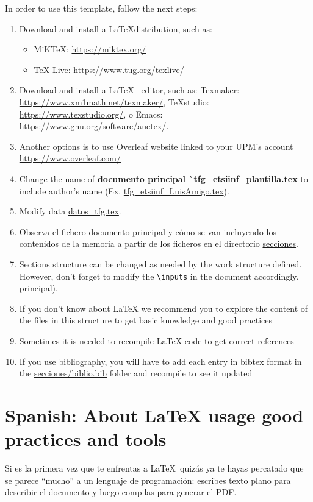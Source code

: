 \medskip

In order to use this template, follow the next steps:
\begin{enumerate}
\item Download and install a \LaTeX distribution, such as:
  \begin{itemize}
  \item MiKTeX:  \url{https://miktex.org/}
  \item TeX Live: \url{https://www.tug.org/texlive/}
  \end{itemize}
\item Download and install a \LaTeX~ editor, such as:
  Texmaker: \url{https://www.xm1math.net/texmaker/}, TeXstudio:
  \url{https://www.texstudio.org/}, o Emacs:
  \url{https://www.gnu.org/software/auctex/}.
\item Another options is to use Overleaf website linked to your UPM's account \url{https://www.overleaf.com/}
\item Change the name of \textbf{documento principal
    \url{`tfg_etsiinf_plantilla.tex}} to include author's name (Ex. \url{tfg_etsiinf_LuisAmigo.tex}).
\item Modify data \url{datos_tfg.tex}.
\item Observa el fichero documento principal y cómo se van incluyendo
  los contenidos de la memoria a partir de los ficheros en el
  directorio \url{secciones}.
\item Sections structure can be changed as needed by the work structure defined. However, don't forget to modify the \verb|\inputs| in the document accordingly.
  principal).
\item If you don't know about LaTeX we recommend you to explore the content of the files in this structure to get basic knowledge and good practices
\item Sometimes it is needed to recompile LaTeX code to get correct references
\item If you use bibliography, you will have to add each entry in \url{bibtex} format in the \url{secciones/biblio.bib} folder and recompile to see it updated
\end{enumerate}

\section{Spanish: About LaTeX usage good practices and tools}
\label{sec:latex}

Si es la primera vez que te enfrentas a \LaTeX\ quizás ya te hayas
percatado que se parece ``mucho'' a un lenguaje de programación:
escribes texto plano para describir el documento y luego compilas para
generar el PDF.


